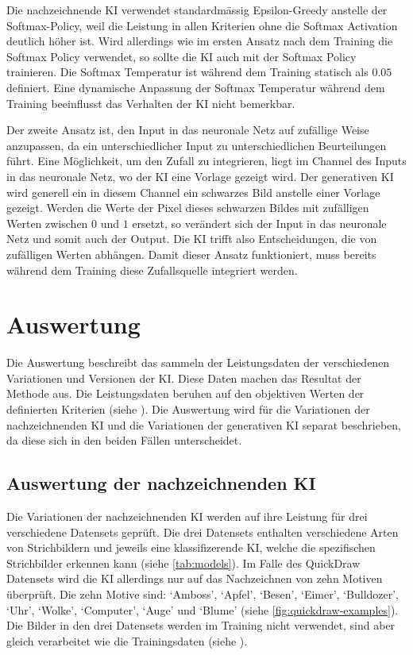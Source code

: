 Die nachzeichnende KI verwendet standardmässig Epsilon-Greedy anstelle der
Softmax-Policy, weil die Leistung in allen Kriterien ohne die Softmax Activation
deutlich höher ist. Wird allerdings wie im ersten Ansatz nach dem Training die
Softmax Policy verwendet, so sollte die KI auch mit der Softmax Policy
trainieren. Die Softmax Temperatur ist während dem Training statisch als $0.05$
definiert. Eine dynamische Anpassung der Softmax Temperatur während dem Training
beeinflusst das Verhalten der KI nicht bemerkbar.

Der zweite Ansatz ist, den Input in das neuronale Netz auf zufällige Weise
anzupassen, da ein unterschiedlicher Input zu unterschiedlichen Beurteilungen
führt. Eine Möglichkeit, um den Zufall zu integrieren, liegt im Channel des
Inputs in das neuronale Netz, wo der KI eine Vorlage gezeigt wird. Der
generativen KI wird generell ein in diesem Channel ein schwarzes Bild anstelle
einer Vorlage gezeigt. Werden die Werte der Pixel dieses schwarzen Bildes mit
zufälligen Werten zwischen $0$ und $1$ ersetzt, so verändert sich der Input in
das neuronale Netz und somit auch der Output. Die KI trifft also Entscheidungen,
die von zufälligen Werten abhängen. Damit dieser Ansatz funktioniert, muss
bereits während dem Training diese Zufallsquelle integriert werden.


\section{Auswertung}\label{chap:m_auswert}
Die Auswertung beschreibt das sammeln der Leistungsdaten der verschiedenen
Variationen und Versionen der KI. Diese Daten machen das Resultat der Methode
aus. Die Leistungsdaten beruhen auf den objektiven Werten der definierten
Kriterien (siehe ). Die Auswertung wird für die
Variationen der nachzeichnenden KI und die Variationen der generativen KI
separat beschrieben, da diese sich in den beiden Fällen unterscheidet.

\subsection{Auswertung der nachzeichnenden KI}\label{sub:m_auswert_nachzeich}
Die Variationen der nachzeichnenden KI werden auf ihre Leistung für drei
verschiedene Datensets geprüft. Die drei Datensets enthalten verschiedene Arten
von Strichbildern und jeweils eine klassifizerende KI, welche die spezifischen
Strichbilder erkennen kann (siehe \autoref{tab:models}). Im Falle des QuickDraw
Datensets wird die KI allerdings nur auf das Nachzeichnen von zehn Motiven
überprüft. Die zehn Motive sind: `Amboss', `Apfel', `Besen', `Eimer',
`Bulldozer', `Uhr', `Wolke', `Computer', `Auge' und `Blume' (siehe
\autoref{fig:quickdraw-examples}). Die Bilder in den drei Datensets werden im
Training nicht verwendet, sind aber gleich verarbeitet wie die Trainingsdaten
(siehe ).

